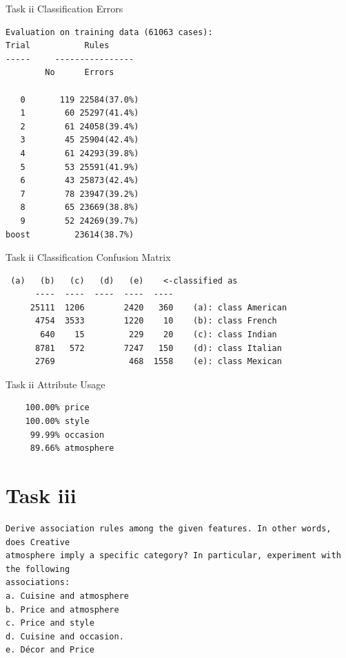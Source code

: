 \documentclass[letterpaper,10pt]{article}
\begin{document}
\begin{table}[H]
\centering
\setlength\tabcolsep{2pt}
\begin{minipage}{0.38\textwidth}
\caption{Task ii Classification Errors}
\begin{verbatim}
Evaluation on training data (61063 cases):
Trial	        Rules     
-----	  ----------------
	    No      Errors

   0	   119 22584(37.0%)
   1	    60 25297(41.4%)
   2	    61 24058(39.4%)
   3	    45 25904(42.4%)
   4	    61 24293(39.8%)
   5	    53 25591(41.9%)
   6	    43 25873(42.4%)
   7	    78 23947(39.2%)
   8	    65 23669(38.8%)
   9	    52 24269(39.7%)
boost	      23614(38.7%) 
\end{verbatim}
\label{tab:tii_err} 
\end{minipage}%
\begin{minipage}{0.68\textwidth}
\caption{Task ii Classification Confusion Matrix} 
\begin{verbatim}
 (a)   (b)   (c)   (d)   (e)    <-classified as
	  ----  ----  ----  ----  ----
	 25111  1206        2420   360    (a): class American
	  4754  3533        1220    10    (b): class French
	   640    15         229    20    (c): class Indian
	  8781   572        7247   150    (d): class Italian
	  2769               468  1558    (e): class Mexican
\end{verbatim}
 \label{tab:tii_cm} 
\end{minipage} 
\begin{minipage}{0.48\textwidth}
\centering
\caption{Task ii Attribute Usage} 
\begin{verbatim}
	100.00%	price
	100.00%	style
	 99.99%	occasion
	 89.66%	atmosphere
\end{verbatim}
 \label{tab:tii_au} 
\end{minipage}
\end{table}
\clearpage
\newpage
{}
\section*{Task iii}
\begin{verbatim}
Derive association rules among the given features. In other words, does Creative
atmosphere imply a specific category? In particular, experiment with the following
associations:
a. Cuisine and atmosphere
b. Price and atmosphere
c. Price and style
d. Cuisine and occasion.
e. Décor and Price
\end{verbatim}
\end{document}
